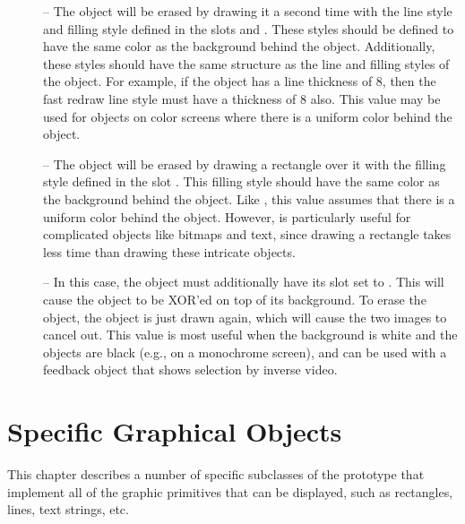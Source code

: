 \begin{description}
\item[]  -- The object will be erased by drawing it a second time
with the line style and filling style defined in the slots
 and .
These styles should be defined to
have the same color as the background behind the object.
Additionally, these styles should have the same structure as the line
and filling styles of the object.  For example, if the object has a
line thickness of 8, then the fast redraw line style must have a
thickness of 8 also.  This value may be used for objects on color screens
where there is a uniform color behind the object.

\item[] \vspace{1 line}
\begin{group}
 -- The object will be erased by drawing a rectangle over
it with the filling style defined in the slot .
This filling style should have the same color as the
background behind the object.  Like , this value assumes
that there is a uniform color behind the object.  However, 
is particularly useful for complicated objects like bitmaps and text,
since drawing a rectangle takes less time than drawing these intricate
objects.
\end{group}
\vspace{1 line}

\begin{group}
 -- In this case, the object must additionally have its
 slot set to .  This will cause the object
to be XOR'ed on top of its background.  To erase the object, the
object is just drawn again, which will cause the two images to cancel out.
This value is most useful when the background is white and the objects
are black (e.g., on a monochrome screen), and can be used with a
feedback object that shows selection by inverse video.
\end{group}

\end{description}



\chapter{Specific Graphical Objects}
\label{specificobs}

This chapter describes a number of specific subclasses of the
 prototype that implement all of the graphic
primitives that can be displayed, such as rectangles, lines, text strings, etc.

